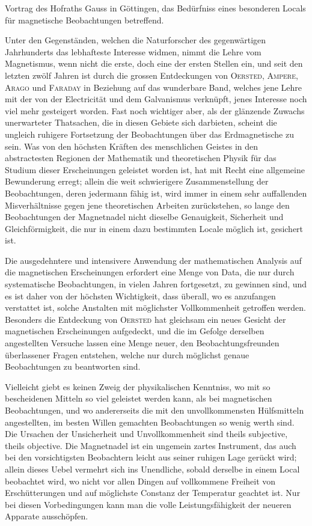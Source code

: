 \documentclass[12pt,a4paper]{article}
\begin{document}
Vortrag des Hofraths Gauss in G\"ottingen, das Bed\"urfniss eines besonderen Locals f\"ur magnetische Beobachtungen betreffend.

Unter den Gegenst\"anden, welchen die Naturforscher des gegenw\"artigen Jahrhunderts das lebhafteste Interesse widmen, nimmt die Lehre vom Magnetismus, wenn nicht die erste, doch eine der ersten Stellen ein, und seit den letzten zw\"olf Jahren ist durch die grossen Entdeckungen von \textsc{Oersted}, \textsc{Ampere}, \textsc{Arago} und \textsc{Faraday} in Beziehung auf das wunderbare Band, welches jene Lehre mit der von der Electricit\"at und dem Galvanismus verkn\"upft, jenes Interesse noch viel mehr gesteigert worden. Fast noch wichtiger aber, als der gl\"anzende Zuwachs unerwarteter Thatsachen, die in diesen Gebiete sich darbieten, scheint die ungleich ruhigere Fortsetzung der Beobachtungen \"uber das Erdmagnetische zu sein. Was von den h\"ochsten Kr\"aften des menschlichen Geistes in den abstractesten Regionen der Mathematik und theoretischen Physik f\"ur das Studium dieser Erscheinungen geleistet worden ist, hat mit Recht eine allgemeine Bewunderung erregt; allein die weit schwierigere Zusammenstellung der Beobachtungen, deren jedermann f\"ahig ist, wird immer in einem sehr auffallenden Misverh\"altnisse gegen jene theoretischen Arbeiten zur\"uckstehen, so lange den Beobachtungen der Magnetnadel nicht dieselbe Genauigkeit, Sicherheit und Gleichf\"ormigkeit, die nur in einem dazu bestimmten Locale m\"oglich ist, gesichert ist.

Die ausgedehntere und intensivere Anwendung der mathematischen Analysis auf die magnetischen Erscheinungen erfordert eine Menge von Data, die nur durch systematische Beobachtungen, in vielen Jahren fortgesetzt, zu gewinnen sind, und es ist daher von der h\"ochsten Wichtigkeit, dass \"uberall, wo es anzufangen verstattet ist, solche Anstalten mit m\"oglichster Vollkommenheit getroffen werden. Besonders die Entdeckung von \textsc{Oersted} hat gleichsam ein neues Gesicht der magnetischen Erscheinungen aufgedeckt, und die im Gefolge derselben angestellten Versuche lassen eine Menge neuer, den Beobachtungsfreunden \"uberlassener Fragen entstehen, welche nur durch m\"oglichst genaue Beobachtungen zu beantworten sind.

Vielleicht giebt es keinen Zweig der physikalischen Kenntniss, wo mit so bescheidenen Mitteln so viel geleistet werden kann, als bei magnetischen Beobachtungen, und wo andererseits die mit den unvollkommensten H\"ulfsmitteln angestellten, im besten Willen gemachten Beobachtungen so wenig werth sind. Die Ursachen der Unsicherheit und Unvollkommenheit sind theils subjective, theils objective. Die Magnetnadel ist ein ungemein zartes Instrument, das auch bei den vorsichtigsten Beobachtern leicht aus seiner ruhigen Lage ger\"uckt wird; allein dieses Uebel vermehrt sich ins Unendliche, sobald derselbe in einem Local beobachtet wird, wo nicht vor allen Dingen auf vollkommene Freiheit von Ersch\"utterungen und auf m\"oglichste Constanz der Temperatur geachtet ist. Nur bei diesen Vorbedingungen kann man die volle Leistungsf\"ahigkeit der neueren Apparate aussch\"opfen.
\end{document}
